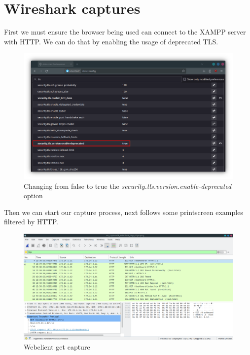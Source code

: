 \documentclass[11pt,a4paper]{report}
\begin{document}
    \section{Wireshark captures}
        \begin{flushleft}
            First we must ensure the browser being used can connect to the XAMPP server with HTTP. We can do that by enabling the usage of deprecated TLS.
            \clearpage
            \begin{figure}[h]
                \centering
                \includegraphics[scale=0.4]{phase1/images/librewolf_tls} 
                \caption{Changing from false to true the \textit{security.tls.version.enable-deprecated} option}
                \label{fig:librewolf}
            \end{figure}

            Then we can start our capture process, next follows some printscreen examples filtered by HTTP.
            \begin{flushleft}
                \begin{figure}[h]
                    \centering
                    \includegraphics[scale=0.43]{phase1/images/wscapwcsocket05} %
                    \caption{Webclient get capture} \label{fig:wireshark1}
                \end{figure}
                

\end{flushleft}
\end{flushleft}
\end{document}
